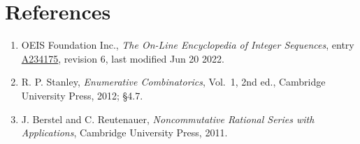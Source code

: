\documentclass[11pt]{article}
\theoremstyle{definition}
\begin{document}
\section{References}

\begin{enumerate}

\item OEIS Foundation Inc., \emph{The On-Line Encyclopedia of Integer Sequences}, entry \href{https://oeis.org/A234175}{A234175}, revision 6, last modified Jun 20 2022.

\item R. P. Stanley, \emph{Enumerative Combinatorics}, Vol.~1, 2nd ed., Cambridge University Press, 2012; \S4.7.

\item J. Berstel and C. Reutenauer, \emph{Noncommutative Rational Series with Applications}, Cambridge University Press, 2011.

\end{enumerate}
\end{document}
